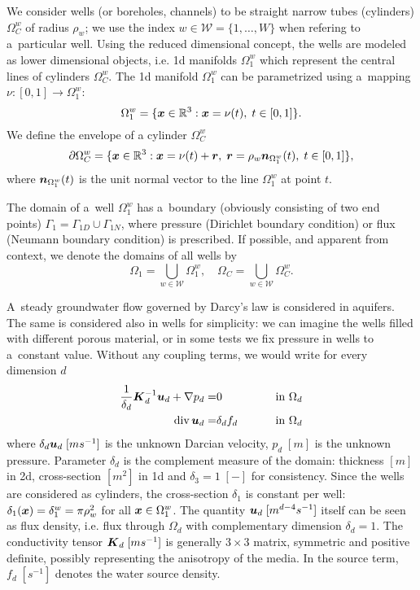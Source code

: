 We consider wells (or boreholes, channels) to be straight narrow tubes (cylinders) $\Omega^w_C$ of radius $\rho_w$;
we use the index $w\in\mathcal{W}=\{1,\ldots,W\}$ when refering to a~particular well.
Using the reduced dimensional concept, the wells are modeled as lower dimensional objects,
i.e. 1d manifolds $\Omega^w_1$ which represent the central lines of cylinders $\Omega^w_C$.
The 1d manifold $\Omega^w_1$ can be parametrized using a~mapping $\nu: [0,1] \rightarrow \Omega^w_1$:
\begin{equation} \label{eqn:1d_parametrization}
    \Omega^w_1 = \{\vc x\in\R^3: \vc x = \nu(t),\; t\in[0,1] \}. %
\end{equation}
We define the envelope of a cylinder $\Omega^w_C$
\[
    \partial\Omega^w_C = \{\mathbf{\boldsymbol{x}}\in\mathbb{R}^3: \mathbf{\boldsymbol{x}} = \nu(t) + \mathbf{\boldsymbol{r}},\; \mathbf{\boldsymbol{r}}=\rho_w\mathbf{\boldsymbol{n}}_{\Omega^w_1}(t),\; t\in[0,1] \},
\]
where $\mathbf{\boldsymbol{n}}_{\Omega^w_1}(t)$ is the unit normal vector to the line $\Omega^w_1$ at point $t$.

The domain of a~well $\Omega^w_1$ has a~boundary (obviously consisting of two end points)
$\Gamma_1 = \Gamma_{1D} \cup \Gamma_{1N}$, where pressure (Dirichlet boundary condition)
or flux (Neumann boundary condition) is prescribed.
If possible, and apparent from context, we denote the domains of all wells by
\[
    \Omega_1 = \bigcup_{w\in\mathcal{W}} \Omega^w_1, \quad \Omega_C = \bigcup_{w\in\mathcal{W}} \Omega^w_C.
\]

A~steady groundwater flow governed by Darcy's law is considered in aquifers.
The same is considered also in wells for simplicity:
we can imagine the wells filled with different porous material, or in some tests we fix pressure in wells to a~constant value.
Without any coupling terms, we would write for every dimension $d$
\begin{eqnarray*}
     \frac{1}{\delta_d} \mathbf{\boldsymbol{K}}_d^{-1} \mathbf{\boldsymbol{u}}_d + \nabla p_d =& 0  &\qquad \textrm{ in }\Omega_d\\
      {\rm div}\,\mathbf{\boldsymbol{u}}_d  =& \delta_d f_d  &\qquad \textrm{ in }\Omega_d
\end{eqnarray*}
where $\delta_d\mathbf{\boldsymbol{u}}_d\; [ms^{-1}]$ is the unknown Darcian velocity, $p_d \; [m]$ is the unknown pressure.
Parameter $\delta_d$ is the complement measure of the domain: thickness $[m]$ in 2d,
cross-section $[m^2]$ in 1d and $\delta_3=1\; [-]$ for consistency. Since the wells are considered as cylinders,
the cross-section $\delta_1$ is constant per well: $\delta_1(\mathbf{\boldsymbol{x}})=\delta^w_1=\pi\rho^2_w$ for all $\mathbf{\boldsymbol{x}}\in \Omega^w_1$.
The quantity $\mathbf{\boldsymbol{u}}_d\; [m^{d-4}s^{-1}]$ itself can be seen as flux density, i.e. flux through $\Omega_d$
with complementary dimension $\delta_d=1$.
The conductivity tensor $\mathbf{\boldsymbol{K}}_d\; [ms^{-1}]$ is generally $3\times 3$ matrix,
symmetric and positive definite, possibly representing the anisotropy of the media.
In the source term, $f_d\;[s^{-1}]$ denotes the water source density.


